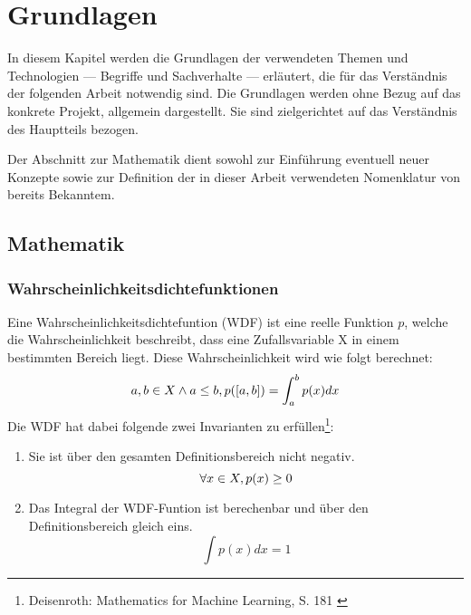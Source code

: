 \chapter{Grundlagen}

In diesem Kapitel werden die Grundlagen der verwendeten Themen und Technologien --- Begriffe und Sachverhalte --- erläutert, die für das Verständnis der folgenden Arbeit notwendig sind.
Die Grundlagen werden ohne Bezug auf das konkrete Projekt, allgemein dargestellt. Sie sind zielgerichtet auf das Verständnis des Hauptteils bezogen.

Der Abschnitt zur Mathematik dient sowohl zur Einführung eventuell neuer Konzepte sowie zur Definition der in dieser Arbeit verwendeten Nomenklatur von bereits Bekanntem.



\section{Mathematik}

\subsection{Wahrscheinlichkeitsdichtefunktionen}
Eine Wahrscheinlichkeitsdichtefuntion (WDF) ist eine reelle Funktion $p$, welche die Wahrscheinlichkeit beschreibt, dass eine Zufallsvariable X in einem bestimmten Bereich liegt. Diese Wahrscheinlichkeit wird wie folgt berechnet:
\begin{equation}
    a,b \in X \land a \le b, \space p([a, b]) = \int_a^b p(x) dx
\end{equation}
Die WDF hat dabei folgende zwei Invarianten zu erfüllen\footnote{
    Deisenroth: Mathematics for Machine Learning, S. 181
    \cite{Deisenroth2020}
}:
\begin{enumerate}
    \item Sie ist über den gesamten Definitionsbereich nicht negativ. 
    \begin{equation}
        \forall x \in X, \space p(x) \ge 0
    \end{equation}
    \item Das Integral der WDF-Funtion ist berechenbar und über den Definitionsbereich gleich eins.
    \begin{equation}
        \int p(x) dx = 1
    \end{equation}
\end{enumerate}

